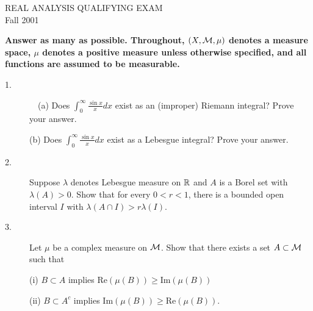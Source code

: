 \documentclass[bbb]{report}
\begin{document}
\begin{large}

\vspace{.12in}

\begin{center}
  REAL ANALYSIS QUALIFYING EXAM \\
  Fall 2001 \\
\end{center}


\vspace{.1in}


\begin{large}
{\bf Answer as many as possible.
Throughout, $(X, {\cal M} ,\mu)$ denotes a measure space,
$\mu$ denotes a positive measure unless otherwise specified, and all
functions are assumed to be measurable.}
\end{large}

\vspace{.1in}

\renewcommand\baselinestretch{1.25}

\begin{description}

\item[1.] \, \, (a)
Does $\int^\infty_0 \frac{\sin x}{x} dx$ exist as an (improper) Riemann
integral? Prove your answer.

\item[\quad] (b)
Does $\int^\infty_0 \frac{\sin x}{x} dx$ exist as a Lebesgue integral?
Prove your answer.

\vspace{.05in}

\item[2.]
Suppose $\lambda$ denotes Lebesgue measure on $\Bbb R$ and $A$ is a Borel
set with
$\lambda (A) > 0$. Show that for every $0<r<1$, there is a bounded open
interval $I$
with $\lambda (A\cap I) > r \lambda (I)$.

\vspace{.05in}

\item[3.]
Let $\mu$ be a complex measure on ${\cal M}$. Show that there exists a set
$A \subset {\cal M}$ such that

\item[\quad] (i)
$B \subset A$ implies $\text{Re} (\mu (B)) \geq \text{Im} (\mu (B))$

\item[\quad] (ii)
$B \subset A^c$ implies $\text{Im} (\mu (B)) \geq \text{Re} (\mu (B))$.


\end{description}
\end{large}
\end{document}

